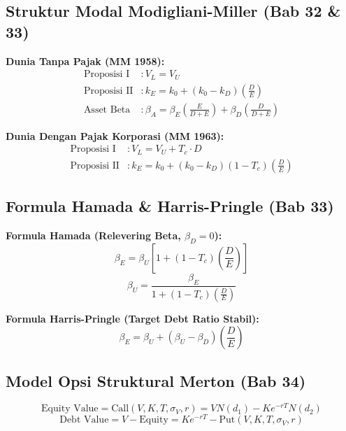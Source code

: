 \documentclass[10pt,a4paper]{article}
\begin{document}
\subsection{Struktur Modal Modigliani-Miller (Bab 32 \& 33)}

\textbf{Dunia Tanpa Pajak (MM 1958):}
\begin{align}
\text{Proposisi I} &: V_L = V_U \\
\text{Proposisi II} &: k_E = k_0 + (k_0 - k_D) \left(\frac{D}{E}\right) \\
\text{Asset Beta} &: \beta_A = \beta_E \left(\frac{E}{D + E}\right) + \beta_D \left(\frac{D}{D + E}\right)
\end{align}

\textbf{Dunia Dengan Pajak Korporasi (MM 1963):}
\begin{align}
\text{Proposisi I} &: V_L = V_U + T_c \cdot D \\
\text{Proposisi II} &: k_E = k_0 + (k_0 - k_D)(1 - T_c) \left(\frac{D}{E}\right)
\end{align}

\subsection{Formula Hamada \& Harris-Pringle (Bab 33)}

\textbf{Formula Hamada (Relevering Beta, $\beta_D = 0$):}
\begin{equation}
\boxed{\beta_E = \beta_U \left[1 + (1 - T_c) \left(\frac{D}{E}\right)\right]}
\end{equation}
\begin{equation}
\beta_U = \frac{\beta_E}{1 + (1 - T_c) \left(\frac{D}{E}\right)}
\end{equation}

\textbf{Formula Harris-Pringle (Target Debt Ratio Stabil):}
\begin{equation}
\beta_E = \beta_U + (\beta_U - \beta_D) \left(\frac{D}{E}\right)
\end{equation}

\subsection{Model Opsi Struktural Merton (Bab 34)}

\begin{equation}
\text{Equity Value} = \text{Call}(V, K, T, \sigma_V, r) = V N(d_1) - K e^{-rT} N(d_2)
\end{equation}
\begin{equation}
\text{Debt Value} = V - \text{Equity} = K e^{-rT} - \text{Put}(V, K, T, \sigma_V, r)
\end{equation}
\end{document}
